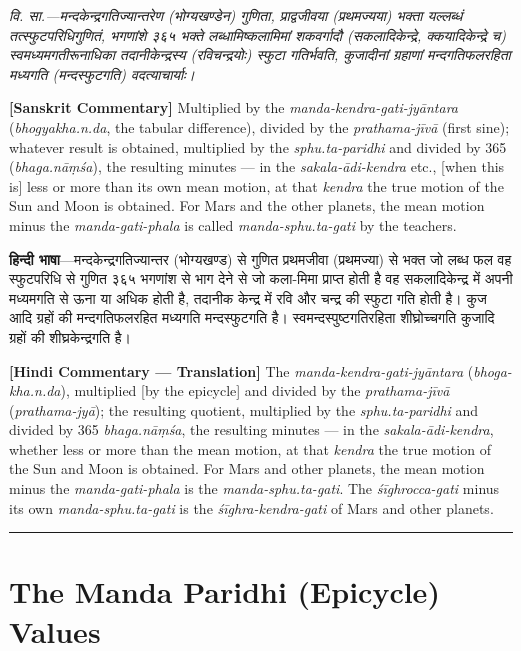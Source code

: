 \documentclass[11pt,a4paper]{book}
\newcommand{\dev}[1]{{\devanagarifont #1}}
\newcommand{\sktcommbilingual}[2]{%
  \par\vspace{0.5em}%
  \noindent\begin{minipage}[t]{0.48\textwidth}
    \RaggedRight\small\itshape
    \dev{#1}
  \end{minipage}%
  \hfill
  \begin{minipage}[t]{0.48\textwidth}
    \RaggedRight\small
    #2%
  \end{minipage}%
  \par\vspace{0.5em}%
}
\newcommand{\hindicommbilingual}[2]{%
  \par\vspace{0.5em}%
  \noindent\begin{minipage}[t]{0.48\textwidth}
    \RaggedRight\small
    \dev{#1}
  \end{minipage}%
  \hfill
  \begin{minipage}[t]{0.48\textwidth}
    \RaggedRight\small
    #2%
  \end{minipage}%
  \par\vspace{0.5em}%
}
\newcommand{\secdivider}{%
  \begin{center}\rule{0.4\textwidth}{0.5pt}\end{center}%
}
\begin{document}
\vspace{0.5em}

\sktcommbilingual{%
\dev{वि. सा.}---मन्दकेन्द्रगतिज्यान्तरेण (भोग्यखण्डेन) गुणिता, प्राद्वजीवया (प्रथमज्यया) भक्ता यल्लब्धं तत्स्फुटपरिधिगुणितं, भगणांशे ३६५ भक्ते लब्धामिष्कलामिमां शकवर्गादौ (सकलादिकेन्द्रे, क्कयादिकेन्द्रे च) स्वमध्यमगतीरूनाधिका तदानीकेन्द्रस्य (रविचन्द्रयोः) स्फुटा गतिर्भवति, कुजादीनां ग्रहाणां मन्दगतिफलरहिता मध्यगति (मन्दस्फुटगति) वदत्याचार्याः।
}{%
\textbf{[Sanskrit Commentary]} Multiplied by the \textit{manda-kendra-gati-jyāntara} (\textit{bhogyakha.n.da}, the tabular difference), divided by the \textit{prathama-jīvā} (first sine); whatever result is obtained, multiplied by the \textit{sphu.ta-paridhi} and divided by 365 (\textit{bhaga.nāṃśa}), the resulting minutes --- in the \textit{sakala-ādi-kendra} etc., [when this is] less or more than its own mean motion, at that \textit{kendra} the true motion of the Sun and Moon is obtained. For Mars and the other planets, the mean motion minus the \textit{manda-gati-phala} is called \textit{manda-sphu.ta-gati} by the teachers.
}

\hindicommbilingual{%
\textbf{हिन्दी भाषा}---मन्दकेन्द्रगतिज्यान्तर (भोग्यखण्ड) से गुणित प्रथमजीवा (प्रथमज्या) से भक्त जो लब्ध फल वह स्फुटपरिधि से गुणित ३६५ भगणांश से भाग देने से जो कला-मिमा प्राप्त होती है वह सकलादिकेन्द्र में अपनी मध्यमगति से ऊना या अधिक होती है, तदानीक केन्द्र में रवि और चन्द्र की स्फुटा गति होती है। कुज आदि ग्रहों की मन्दगतिफलरहित मध्यगति मन्दस्फुटगति है। स्वमन्दस्पुष्टगतिरहिता शीघ्रोच्चगति कुजादि ग्रहों की शीघ्रकेन्द्रगति है।
}{%
\textbf{[Hindi Commentary --- Translation]} The \textit{manda-kendra-gati-jyāntara} (\textit{bhoga-kha.n.da}), multiplied [by the epicycle] and divided by the \textit{prathama-jīvā} (\textit{prathama-jyā}); the resulting quotient, multiplied by the \textit{sphu.ta-paridhi} and divided by 365 \textit{bhaga.nāṃśa}, the resulting minutes --- in the \textit{sakala-ādi-kendra}, whether less or more than the mean motion, at that \textit{kendra} the true motion of the Sun and Moon is obtained. For Mars and other planets, the mean motion minus the \textit{manda-gati-phala} is the \textit{manda-sphu.ta-gati}. The \textit{śīghrocca-gati} minus its own \textit{manda-sphu.ta-gati} is the \textit{śīghra-kendra-gati} of Mars and other planets.
}

\secdivider
\clearpage

\section{The Manda Paridhi (Epicycle) Values}
\end{document}

